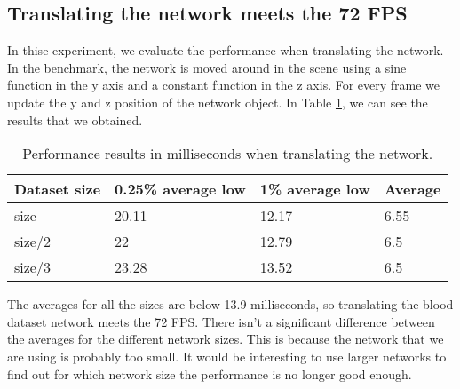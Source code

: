 
\subsection{Translating the network meets the 72 FPS}
In thise experiment, we evaluate the performance when translating the network. In the benchmark, the network is moved around in the scene using a sine function in the y axis and a constant function in the z axis. For every frame we update the y and z position of the network object. In Table \ref{tab:experiment_moving}, we can see the results that we obtained.

\begin{table}[h!]
\centering
\begin{tabular}{llll}
\hline
Dataset size & 0.25\% average low & 1\% average low & Average \\
\hline
size & 20.11 & 12.17 & 6.55 \\
size/2 & 22  & 12.79 & 6.5 \\
size/3 & 23.28 & 13.52 & 6.5 \\
\end{tabular}
\caption{Performance results in milliseconds when translating the network.}
\label{tab:experiment_moving}
\end{table}

The averages for all the sizes are below 13.9 milliseconds, so translating the blood dataset network meets the 72 FPS. There isn't a significant difference between the averages for the different network sizes. This is because the network that we are using is probably too small. It would be interesting to use larger networks to find out for which network size the performance is no longer good enough.



